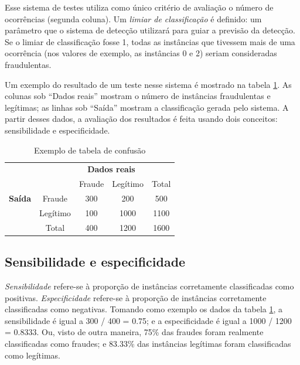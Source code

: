 Esse sistema de testes utiliza como único critério de avaliação o número de ocorrências (segunda coluna). Um \emph{limiar de classificação} é definido: um parâmetro que o sistema de detecção utilizará para guiar a previsão da detecção. Se o limiar de classificação fosse 1, todas as instâncias que tivessem mais de uma ocorrência (nos valores de exemplo, as instâncias 0 e 2) seriam consideradas fraudulentas.

Um exemplo do resultado de um teste nesse sistema é mostrado na tabela \ref{fraud:ex}. As colunas sob ``Dados reais'' mostram o número de instâncias fraudulentas e legítimas; as linhas sob ``Saída'' mostram a classificação gerada pelo sistema. A partir desses dados, a avaliação dos resultados é feita usando dois conceitos: sensibilidade e especificidade.

\renewcommand{\arraystretch}{1.5}
\begin{table}[h!]
    \vspace{2mm}
    \centering
    \begin{tabular}{c l c c c}
        & & \multicolumn{2}{c}{\textbf{Dados reais}} \\
        \multirow{3}{5mm}{\begin{sideways}\parbox{20mm}{\textbf{Saída}}\end{sideways}} & \multicolumn{1}{c|}{} & Fraude & Legítimo & \multicolumn{1}{|c}{Total} \\
        \cline{2-5}
        & \multicolumn{1}{c|}{Fraude}   & 300 & 200   & \multicolumn{1}{|c}{500}  \\
        & \multicolumn{1}{c|}{Legítimo} & 100 & 1000  & \multicolumn{1}{|c}{1100} \\
        \cline{2-5}
        & \multicolumn{1}{c|}{Total}    & 400 & 1200  & \multicolumn{1}{|c}{1600} \\
    \end{tabular}
    \caption{Exemplo de tabela de confusão}
    \label{fraud:ex}
    \vspace{2mm}
\end{table}

\subsection{Sensibilidade e especificidade}

\emph{Sensibilidade} refere-se à proporção de instâncias corretamente classificadas como positivas. \emph{Especificidade} refere-se à proporção de instâncias corretamente classificadas como negativas. Tomando como exemplo os dados da tabela \ref{fraud:ex}, a sensibilidade é igual a 300 / 400 = 0.75; e a especificidade é igual a 1000 / 1200 = 0.8333. Ou, visto de outra maneira, 75\% das fraudes foram realmente classificadas como fraudes; e 83.33\% das instâncias legítimas foram classificadas como legítimas.

